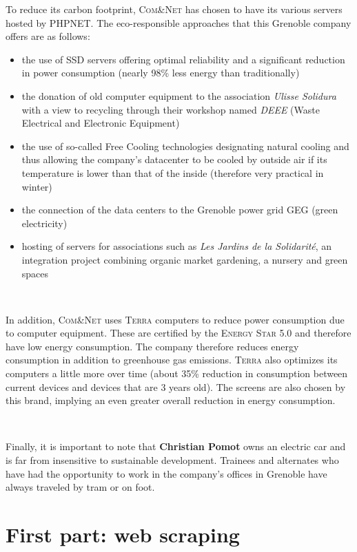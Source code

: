\documentclass[12pt]{article}
\begin{document}
To reduce its carbon footprint, \textsc{Com\&Net} has chosen to have its various servers hosted by \textsc{PHPNET}. The eco-responsible approaches that this Grenoble company offers are as follows:
\begin{itemize}
	\item the use of SSD servers offering optimal reliability and a significant reduction in power consumption (nearly 98\% less energy than traditionally)
	\item the donation of old computer equipment to the association \textit{Ulisse Solidura} with a view to recycling through their workshop named \textit{DEEE} (Waste Electrical and Electronic Equipment)
	\item the use of so-called Free Cooling technologies designating natural cooling and thus allowing the company's datacenter to be cooled by outside air if its temperature is lower than that of the inside (therefore very practical in winter)
	\item the connection of the data centers to the Grenoble power grid \textsc{GEG} (green electricity)
	\item hosting of servers for associations such as \textit{Les Jardins de la Solidarité}, an integration project combining organic market gardening, a nursery and green spaces
\end{itemize}

\

In addition, \textsc{Com\&Net} uses \textsc{Terra} computers to reduce power consumption due to computer equipment. These are certified by the \textsc{Energy Star 5.0} and therefore have low energy consumption. The company therefore reduces energy consumption in addition to greenhouse gas emissions. \textsc{Terra} also optimizes its computers a little more over time (about 35\% reduction in consumption between current devices and devices that are 3 years old). The screens are also chosen by this brand, implying an even greater overall reduction in energy consumption.

\

Finally, it is important to note that \textbf{Christian Pomot} owns an electric car and is far from insensitive to sustainable development. Trainees and alternates who have had the opportunity to work in the company's offices in Grenoble have always traveled by tram or on foot.


\newpage
\section{First part: web scraping}
\end{document}
